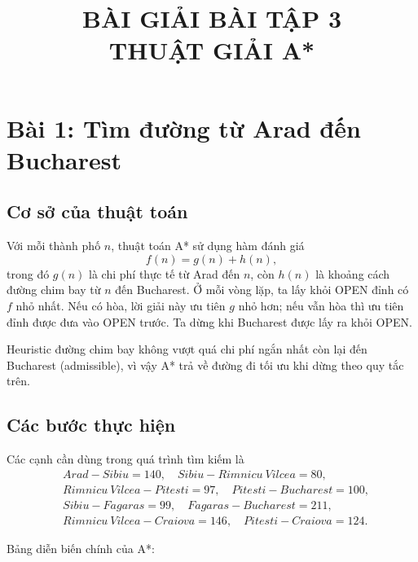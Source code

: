 \documentclass[12pt,a4paper]{article}
\title{\textbf{BÀI GIẢI BÀI TẬP 3\\ THUẬT GIẢI A*}}
\author{}
\date{}
\begin{document}
\maketitle
\tableofcontents
\newpage

\section{Bài 1: Tìm đường từ Arad đến Bucharest}

\subsection{Cơ sở của thuật toán}

Với mỗi thành phố $n$, thuật toán A* sử dụng hàm đánh giá
\[
    f(n)=g(n)+h(n),
\]
trong đó $g(n)$ là chi phí thực tế từ Arad đến $n$, còn $h(n)$ là khoảng
cách đường chim bay từ $n$ đến Bucharest. Ở mỗi vòng lặp, ta lấy khỏi
OPEN đỉnh có $f$ nhỏ nhất. Nếu có hòa, lời giải này ưu tiên $g$ nhỏ hơn;
nếu vẫn hòa thì ưu tiên đỉnh được đưa vào OPEN trước. Ta dừng khi
Bucharest được lấy ra khỏi OPEN.

Heuristic đường chim bay không vượt quá chi phí ngắn nhất còn lại đến
Bucharest (admissible), vì vậy A* trả về đường đi tối ưu khi dừng theo
quy tắc trên.

\subsection{Các bước thực hiện}

Các cạnh cần dùng trong quá trình tìm kiếm là
\[
\begin{aligned}
&Arad\mathbin{-}Sibiu=140,\quad Sibiu\mathbin{-}Rimnicu\ Vilcea=80,\\
&Rimnicu\ Vilcea\mathbin{-}Pitesti=97,\quad Pitesti\mathbin{-}Bucharest=100,\\
&Sibiu\mathbin{-}Fagaras=99,\quad Fagaras\mathbin{-}Bucharest=211,\\
&Rimnicu\ Vilcea\mathbin{-}Craiova=146,\quad Pitesti\mathbin{-}Craiova=124.
\end{aligned}
\]

Bảng diễn biến chính của A*:
\end{document}
